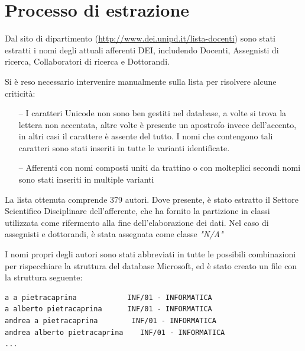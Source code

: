 \documentclass[12pt,a4paper,twoside]{report}
\begin{document}
\section{Processo di estrazione} \label{sec:processo}

Dal sito di dipartimento (\url{http://www.dei.unipd.it/lista-docenti}) sono stati estratti i nomi
degli attuali afferenti DEI, includendo Docenti, Assegnisti di ricerca, Collaboratori di ricerca e
Dottorandi.

Si è reso necessario intervenire manualmente sulla lista per risolvere alcune criticità:
\begin{itemize}
\item[--]
    I caratteri Unicode non sono ben gestiti nel database, a volte si trova la lettera non
        accentata, altre volte è presente un apostrofo invece dell'accento, in altri casi il
        carattere è assente del tutto. I nomi che contengono tali caratteri sono stati inseriti in
        tutte le varianti identificate.
\item[--]
    Afferenti con nomi composti uniti da trattino o con molteplici secondi nomi sono stati inseriti
        in multiple varianti
\end{itemize}

La lista ottenuta comprende 379 autori.
Dove presente, è stato estratto il Settore Scientifico Disciplinare dell'afferente, che ha fornito
la partizione in classi utilizzata come rifermento alla fine dell'elaborazione dei dati.
Nel caso di assegnisti e dottorandi, è stata assegnata come classe \textit{"N/A"}

I nomi propri degli autori sono stati abbreviati in tutte le possibili combinazioni per rispecchiare
la struttura del database Microsoft, ed è stato creato un file con la struttura seguente:

\begin{center}
\begin{minipage}{0.90\textwidth}
\begin{verbatim}
a a pietracaprina            INF/01 - INFORMATICA
a alberto pietracaprina	     INF/01 - INFORMATICA
andrea a pietracaprina	      INF/01 - INFORMATICA
andrea alberto pietracaprina	INF/01 - INFORMATICA
...

\end{verbatim}
\end{minipage}
\end{center}
\end{document}
